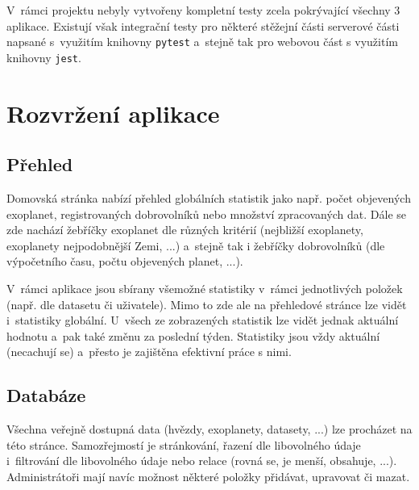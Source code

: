 \documentclass[a4paper,12pt]{article}
\def\code#1{\texttt{#1}}
\begin{document}
{{{{{{{{{{{V~rámci projektu nebyly vytvořeny kompletní testy zcela pokrývající všechny 3 aplikace. Existují však integrační testy pro některé stěžejní části serverové části napsané s~využitím knihovny \code{pytest} a~stejně tak pro webovou část s využitím knihovny \code{jest}.



\section{Rozvržení aplikace}

\subsection{Přehled}

Domovská stránka nabízí přehled globálních statistik jako např. počet objevených exoplanet, registrovaných dobrovolníků nebo množství zpracovaných dat. Dále se zde nachází žebříčky exoplanet dle různých kritérií (nejbližší exoplanety, exoplanety nejpodobnější Zemi, ...) a~stejně tak i žebříčky dobrovolníků (dle výpočetního času, počtu objevených planet, ...).




V~rámci aplikace jsou sbírany všemožné statistiky v~rámci jednotlivých položek (např. dle datasetu či uživatele). Mimo to zde ale na přehledové stránce lze vidět i~statistiky globální. U~všech ze zobrazených statistik lze vidět jednak aktuální hodnotu a~pak také změnu za poslední týden. Statistiky jsou vždy aktuální (necachují se) a~přesto je zajištěna efektivní práce s nimi.


\clearpage

\subsection{Databáze}

Všechna veřejně dostupná data (hvězdy, exoplanety, datasety, ...) lze procházet na této stránce. Samozřejmostí je stránkování, řazení dle libovolného údaje i~filtrování dle libovolného údaje nebo relace (rovná se, je menší, obsahuje, ...). Administrátoři mají navíc možnost některé položky přidávat, upravovat či mazat.


}}}}}}}}}}}
\end{document}
